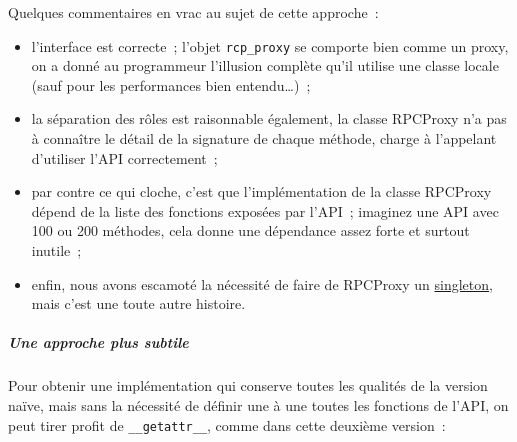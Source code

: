     Quelques commentaires en vrac au sujet de cette approche~:

\begin{itemize}
\tightlist
\item
  l'interface est correcte~; l'objet \texttt{rcp\_proxy} se comporte
  bien comme un proxy, on a donné au programmeur l'illusion complète
  qu'il utilise une classe locale (sauf pour les performances bien
  entendu\ldots{})~;
\item
  la séparation des rôles est raisonnable également, la classe RPCProxy
  n'a pas à connaître le détail de la signature de chaque méthode,
  charge à l'appelant d'utiliser l'API correctement~;
\item
  par contre ce qui cloche, c'est que l'implémentation de la classe
  RPCProxy dépend de la liste des fonctions exposées par l'API~;
  imaginez une API avec 100 ou 200 méthodes, cela donne une dépendance
  assez forte et surtout inutile~;
\item
  enfin, nous avons escamoté la nécessité de faire de RPCProxy un
  \href{http://en.wikipedia.org/wiki/Singleton_pattern}{singleton}, mais
  c'est une toute autre histoire.
\end{itemize}

    \hypertarget{une-approche-plus-subtile}{%
\subparagraph{Une approche plus
subtile}\label{une-approche-plus-subtile}}

    Pour obtenir une implémentation qui conserve toutes les qualités de la
version naïve, mais sans la nécessité de définir une à une toutes les
fonctions de l'API, on peut tirer profit de \texttt{\_\_getattr\_\_},
comme dans cette deuxième version~:


